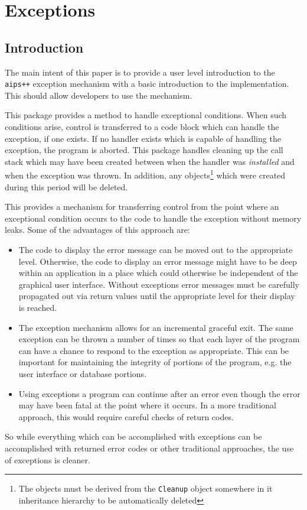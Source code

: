 \chapter{Exceptions \label{Coding.Exceptions}}
\section{Introduction}

The main intent of this paper is to provide a user level introduction to
the {\tt aips++} exception mechanism with a basic introduction to the
implementation. This should allow developers to use the mechanism.

This package provides a method to handle exceptional conditions. When
such conditions arise, control is transferred to a code block which
can handle the exception, if one exists. If no handler exists which is capable
of handling the exception, the program is aborted. This package handles 
cleaning up the call stack which may have been created between when the handler
was {\em installed} and when the exception was thrown. In addition, any
objects\footnote{The objects must be derived from the {\tt Cleanup} object
somewhere in it inheritance hierarchy to be automatically deleted} which were
created during this period will be deleted.

This provides a mechanism for transferring control from the point where an
exceptional condition occurs to the code to handle the exception without
memory leaks. Some of the advantages of this approach are:
\begin{itemize}
\item
The code to display the error message can be moved out to the appropriate
level. Otherwise, the code to display an error message might have to be
deep within an application in a place which could otherwise be independent
of the graphical user interface. Without exceptions error messages must be 
carefully propagated out via return values until the appropriate level for 
their display is reached.
\item
The exception mechanism allows for an incremental graceful exit. The same 
exception can be thrown a number of times so that each layer of the program
can have a chance to respond to the exception as appropriate. This can be
important for maintaining the integrity of portions of the program, e.g.
the user interface or database portions.
\item
Using exceptions a program can continue after an error even though
the error may have been fatal at the point where it occurs. In a more 
traditional approach, this would require careful checks of return codes.
\end{itemize}
\noindent
So while everything which can be accomplished with exceptions can be 
accomplished with returned error codes or other traditional approaches, the
use of exceptions is cleaner.

